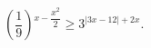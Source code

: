 \begin{ex}[type=inequality]
	\begin{condition}
		$ \left(\dfrac{1}{9}\right)$\tiny$^{x - \dfrac{x^2}{2}}$\normalsize$\geqslant3^{|3x - 12| + 2x} .$
	\end{condition}
\end{ex}